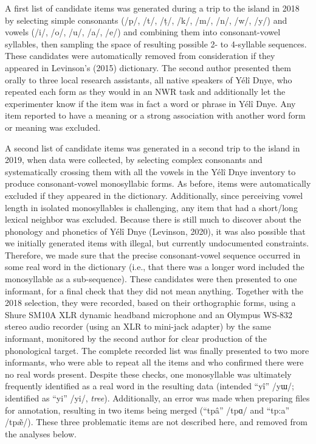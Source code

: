 \documentclass[english,,man,floatsintext]{apa6}
\begin{document}
A first list of candidate items was generated during a trip to the island in 2018 by selecting simple consonants (/p/, /t/, /ṭ/, /k/, /m/, /n/, /w/, /y/) and vowels (/i/, /o/, /u/, /a/, /e/) and combining them into consonant-vowel syllables, then sampling the space of resulting possible 2- to 4-syllable sequences. These candidates were automatically removed from consideration if they appeared in Levinson's (2015) dictionary. The second author presented them orally to three local research assistants, all native speakers of Yélî Dnye, who repeated each form as they would in an NWR task and additionally let the experimenter know if the item was in fact a word or phrase in Yélî Dnye. Any item reported to have a meaning or a strong association with another word form or meaning was excluded.

A second list of candidate items was generated in a second trip to the island in 2019, when data were collected, by selecting complex consonants and systematically crossing them with all the vowels in the Yélî Dnye inventory to produce consonant-vowel monosyllabic forms. As before, items were automatically excluded if they appeared in the dictionary. Additionally, since perceiving vowel length in isolated monosyllables is challenging, any item that had a short/long lexical neighbor was excluded. Because there is still much to discover about the phonology and phonetics of Yélî Dnye (Levinson, 2020), it was also possible that we initially generated items with illegal, but currently undocumented constraints. Therefore, we made sure that the precise consonant-vowel sequence occurred in some real word in the dictionary (i.e., that there was a longer word included the monosyllable as a sub-sequence). These candidates were then presented to one informant, for a final check that they did not mean anything. Together with the 2018 selection, they were recorded, based on their orthographic forms, using a Shure SM10A XLR dynamic headband microphone and an Olympus WS-832 stereo audio recorder (using an XLR to mini-jack adapter) by the same informant, monitored by the second author for clear production of the phonological target. The complete recorded list was finally presented to two more informants, who were able to repeat all the items and who confirmed there were no real words present. Despite these checks, one monosyllable was ultimately frequently identified as a real word in the resulting data (intended \enquote{yî} /yɯ/; identified as \enquote{yi} /yi/, \emph{tree}). Additionally, an error was made when preparing files for annotation, resulting in two items being merged (\enquote{tpâ} /tpɑ/ and \enquote{tp:a} /tpæ̃/). These three problematic items are not described here, and removed from the analyses below.
\end{document}
